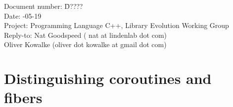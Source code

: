 \documentclass[a4paper,10pt,DIV15]{scrartcl}
\begin{document}
\small
\begin{tabbing}
    Document number: \=  D????\\
    Date:            -05-19 \\
    Project:         \> Programming Language C++, Library Evolution Working Group\\
    Reply-to:        \> Nat Goodspeed ( nat at lindenlab dot com)\\
                     \> Oliver Kowalke (oliver dot kowalke at gmail dot com)\\
\end{tabbing}

\section*{Distinguishing coroutines and fibers}


\tableofcontents












\end{document}
